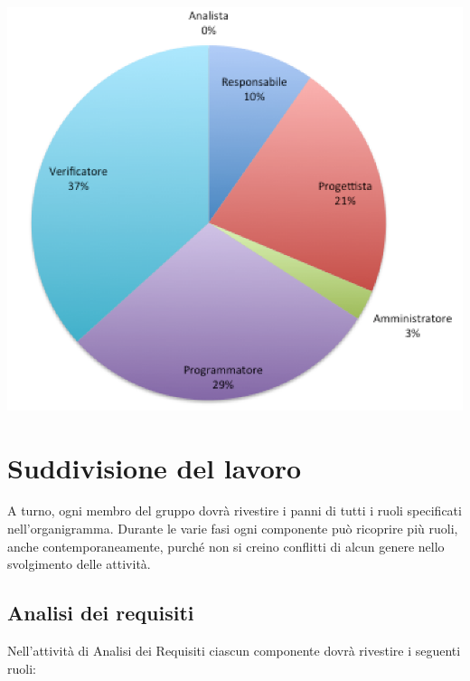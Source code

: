 \begin{center}
  \includegraphics[scale=0.7]{img/grafico8.png}
\end{center}

\section{Suddivisione del lavoro}
A turno, ogni membro del gruppo dovrà rivestire i panni di tutti i
ruoli specificati nell'organigramma. Durante le varie fasi
ogni componente può ricoprire più ruoli, anche contemporaneamente,
purché non si creino conflitti di alcun genere nello svolgimento delle
attività. 

\subsection{Analisi dei requisiti}
Nell’attività di Analisi dei Requisiti ciascun componente dovrà rivestire i seguenti ruoli:

